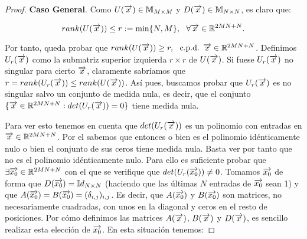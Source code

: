 \begin{proof}
    \textbf{Caso General}. Como $U(\overrightarrow{x}) \in \mathbb{M}_{M \times M}$ y $D(\overrightarrow{x}) \in \mathbb{M}_{N \times N}$, es claro que:

    \begin{equation}
        rank(U(\overrightarrow{x})) \leq r := \min \{ N, M  \}, \ \  \forall \overrightarrow{x} \in \mathbb{R}^{2MN + N}.
    \end{equation}

    Por tanto, queda probar que $rank(U(\overrightarrow{x})) \geq r, \ \  \text{c.p.d. } \overrightarrow{x} \in \mathbb{R}^{2MN + N}$. Definimos $U_r(\overrightarrow{x})$ como la submatriz superior izquierda $r \times r$ de $U(\overrightarrow{x})$. Si fuese $U_r(\overrightarrow{x})$ no singular para cierto $\overrightarrow{x}$, claramente sabríamos que $r = rank(U_r(\overrightarrow{x})) \leq rank(U(\overrightarrow{x}))$. Así pues, buscamos probar que $U_r(\overrightarrow{x})$ es no singular salvo un conjunto de medida nula, es decir, que el conjunto $\{ \overrightarrow{x} \in \mathbb{R}^{2MN + N} : det(U_r(\overrightarrow{x})) = 0  \}$ tiene medida nula.

    Para ver esto tenemos en cuenta que $det(U_r(\overrightarrow{x}))$ es un polinomio con entradas en $\overrightarrow{x} \in \mathbb{R}^{2MN + N}$. Por el  sabemos que entonces o bien es el polinomio idénticamente nulo o bien el conjunto de sus ceros tiene medida nula. Basta ver por tanto que no es el polinomio idénticamente nulo. Para ello es suficiente probar que $\exists \overrightarrow{x_0} \in \mathbb{R}^{2MN + N}$ con el que se verifique que $det(U_r(\overrightarrow{x_0})) \neq 0$. Tomamos $\overrightarrow{x_0}$ de forma que $D(\overrightarrow{x_0}) = \mathbb{I}d_{N \times N}$ (haciendo que las últimas $N$ entradas de $\overrightarrow{x_0}$ sean 1) y que $A(\overrightarrow{x_0}) = B(\overrightarrow{x_0}) = (\delta_{i,j})_{i,j}$. Es decir, que $A(\overrightarrow{x_0})$ y $B(\overrightarrow{x_0})$ son matrices, no necesariamente cuadradas, con unos en la diagonal y ceros en el resto de posiciones. Por cómo definimos las matrices $A(\overrightarrow{x})$, $B(\overrightarrow{x})$ y $D(\overrightarrow{x})$, es sencillo realizar esta elección de $\overrightarrow{x_0}$. En esta situación tenemos:


\end{proof}
